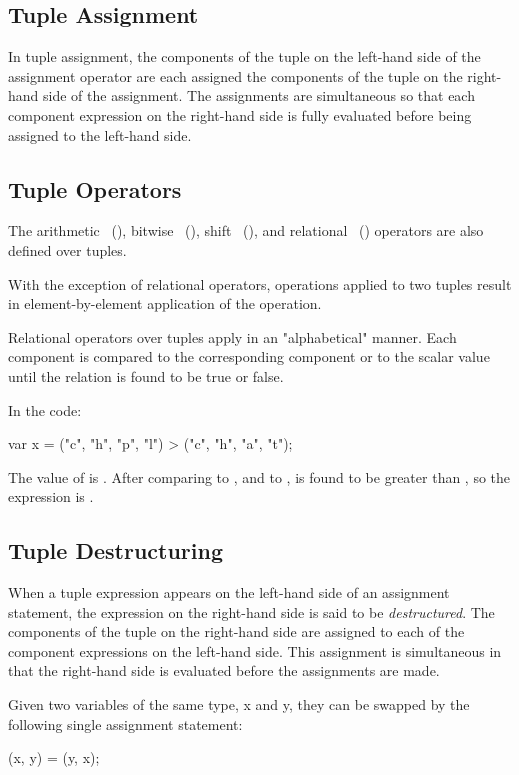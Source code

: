 \subsection{Tuple Assignment}
\label{Tuple_Assignment}

In tuple assignment, the components of the tuple on the left-hand
side of the assignment operator are each assigned the components of
the tuple on the right-hand side of the assignment.  The assignments
are simultaneous so that each component expression on the right-hand
side is fully evaluated before being assigned to the left-hand side.

\subsection{Tuple Operators}
\label{Tuple_Operators}

The arithmetic ~(), bitwise
~(), shift ~(), and
relational ~() operators are also defined
over tuples.

With the exception of relational operators, operations applied to two
tuples result in element-by-element application of the operation.

Relational operators over tuples apply in an "alphabetical" manner.
Each component is compared to the corresponding component or to the
scalar value until the relation is found to be true or false.

\begin{example}
In the code:
\begin{chapel}
var x = ("c", "h", "p", "l") > ("c", "h", "a", "t"); 
\end{chapel}
The value of  is . After comparing  to
, and  to ,  is found to be
greater than , so the expression is . 
\end{example}

\subsection{Tuple Destructuring}
\label{Tuple_Destructuring}

When a tuple expression appears on the left-hand side of an assignment
statement, the expression on the right-hand side is said to be {\em
destructured}.  The components of the tuple on the right-hand side are
assigned to each of the component expressions on the left-hand side.
This assignment is simultaneous in that the right-hand side is
evaluated before the assignments are made.
\begin{example}
Given two variables of the same type, x and y, they can be swapped by
the following single assignment statement:
\begin{chapel}
(x, y) = (y, x);
\end{chapel}
\end{example}

